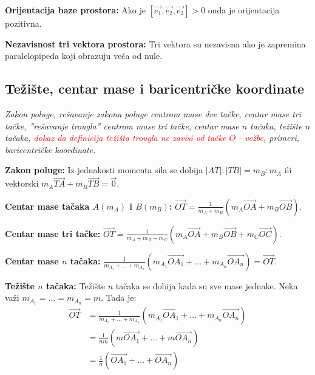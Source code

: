 \documentclass[12pt]{article}
\newcommand{\vek}[1]{\overrightarrow{#1}}
\newcommand{\ocena}[1]{\textcolor{red}{#1}}
\begin{document}
\textbf{Orijentacija baze prostora:} Ako je $[\vek{e_1},\vek{e_2},\vek{e_3}]>0$
onda je orijentacija pozitivna.
\par

\textbf{Nezavisnost tri vektora prostora:} Tri vektora su nezavisna ako je
zapremina paralelopipeda koji obrazuju veća od nule.

\subsection{Težište, centar mase i baricentričke koordinate}
\textit{Zakon poluge, rešavanje zakona poluge centrom mase dve tačke, centar
    mase tri tačke, ”rešavanje trougla” centrom mase tri tačke, centar mase $n$
    tačaka, težište $n$ tačaka, \ocena{dokaz da definicija težišta trougla ne zavisi
        od tačke $O$ - vežbe}, primeri, baricentričke koordinate.}
\par
\vspace*{1cm}

\textbf{Zakon poluge:} Iz jednakosti momenta sila se dobija
$|AT|:|TB|=m_B:m_A$ ili vektorski $m_A\vek{TA}+m_B\vek{TB}=\vek{0}$.
\par

\textbf{Centar mase tačaka $A(m_A)$ i $B(m_B)$:}
$\vek{OT}=\frac{1}{m_A+m_B}(m_A\vek{OA}+m_B\vek{OB})$.
\par

\textbf{Centar mase tri tačke:} $\vek{OT}=\frac{1}{m_A+m_B+m_C}
    (m_A\vek{OA}+m_B\vek{OB}+m_C\vek{OC})$.
\par

\textbf{Centar mase $n$ tačaka:} $\frac{1}{m_{A_1}+\dotsc+m_{A_n}}
    (m_{A_1}\vek{OA_1}+\dotsc+m_{A_n}\vek{OA_n})=\vek{OT}$.
\par

\textbf{Težište $n$ tačaka:} Težište $n$ tačaka se dobija kada su sve mase
jednake. Neka važi $m_{A_1}=\dotsc=m_{A_n}=m$. Tada je:
\begin{align*}
    \vek{OT} & =\frac{1}{m_{A_1}+\dotsc+m_{A_n}}(m_{A_1}\vek{OA_1}+
    \dotsc+m_{A_n}\vek{OA_n})                                       \\
             & =\frac{1}{nm}(m\vek{OA_1}+\dotsc+m\vek{OA_n})        \\
             & =\frac{1}{n}(\vek{OA_1}+\dotsc+\vek{OA_n})
\end{align*}
\par
\end{document}
